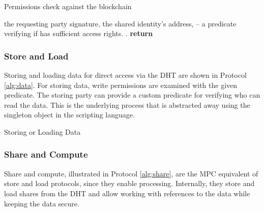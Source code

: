 \documentclass{article} \usepackage{nips13submit_e,times}
\begin{document}
\begin{algorithm}
\caption{Permissions check against the blockchain}\label{alg:check_policy}
\begin{algorithmic}
\Require the requesting party signature,  the shared identity's address,  -- a predicate verifying if  has sufficient access rights.
\Ensure .
	\State 
	\If{}
		\State 
		\If{}
			\State 
		\EndIf
	\EndIf
	\State \textbf{return} 
\EndProcedure
\end{algorithmic}
\end{algorithm}

\subsubsection{Store and Load}

Storing and loading data for direct access via the DHT are shown in Protocol \ref{alg:data}. For storing data, write permissions are examined with the given  predicate. The storing party can provide a custom predicate for verifying who can read the data. This is the underlying process that is abstracted away using the  singleton object in the scripting language.

\begin{algorithm}
\caption{Storing or Loading Data}\label{alg:data}
\begin{algorithmic}
\Require , ,  (data),  -- a predicate for verifying future read access.
\Ensure if successful, returns  -- the pointer to the data (predicate), or  o.w.
	\If {
		\State 
		\State 
		\State 
		\State \textbf{return} 
	\EndIf
	\State \textbf{return} 
\EndProcedure

\Require , ,  -- the address of the data (predicate)
\Ensure if successful, returns the data , or  o.w.
\Procedure{Load}{}
	\State 
	\If {
		\State \textbf{return} 
	\EndIf
	\State \textbf{return} 
\EndProcedure
\end{algorithmic}
\end{algorithm}

\subsubsection{Share and Compute}

Share and compute, illustrated in Protocol \ref{alg:share}, are the MPC equivalent of store and load protocols, since they enable processing. Internally, they store and load shares from the DHT and allow working with references to the data while keeping the data secure.
\end{document}
